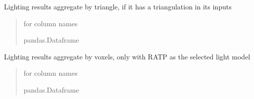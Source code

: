 \documentclass[letterpaper,10pt,english]{sphinxmanual}
\begin{document}
\begin{fulllineitems}
\begin{fulllineitems}
\end{fulllineitems}


\begin{fulllineitems}
\label{\detokenize{reference:LVM.LightVegeManager.triangles_outputs}}
\pysigstartsignatures
{}
\pysigstopsignatures
\sphinxAtStartPar
Lighting results aggregate by triangle, if it has a triangulation in its inputs
\begin{quote}\begin{description}
\sphinxAtStartPar


\nopagebreak


\sphinxAtStartPar
{\hyperref[\detokenize{reference:module-outputs}]{}} for column names




\sphinxAtStartPar
pandas.Dataframe

\end{description}\end{quote}

\end{fulllineitems}


\begin{fulllineitems}
\label{\detokenize{reference:LVM.LightVegeManager.voxels_outputs}}
\pysigstartsignatures
{}
\pysigstopsignatures
\sphinxAtStartPar
Lighting results aggregate by voxels, only with RATP as the selected light model
\begin{quote}\begin{description}
\sphinxAtStartPar


\nopagebreak


\sphinxAtStartPar
{\hyperref[\detokenize{reference:module-outputs}]{}} for column names




\sphinxAtStartPar
pandas.Dataframe


\end{description}
\end{quote}
\end{fulllineitems}
\end{fulllineitems}
\end{document}
